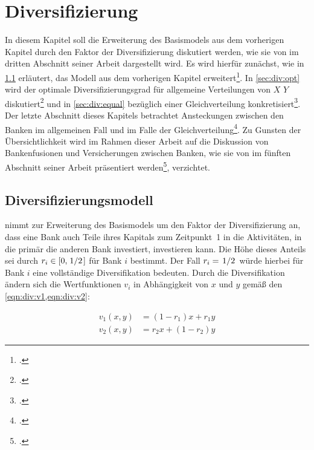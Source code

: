 
\chapter{Diversifizierung}%
\label{chap:div}

In diesem Kapitel soll die Erweiterung des Basismodels aus dem vorherigen Kapitel durch den Faktor der Diversifizierung diskutiert werden, wie sie von \citeauthor{Wagner-2010} im dritten Abschnitt seiner Arbeit dargestellt wird. Es wird hierfür zunächst, wie in \cref{sec:div:model} erläutert, das Modell aus dem vorherigen Kapitel erweitert\footcite[\pno~377\psq(5\psq)]{Wagner-2010}. In \cref{sec:div:opt} wird der optimale Diversifizierungsgrad für allgemeine Verteilungen von $X$ \bzw{} $Y$ diskutiert\footcite[\pno~378\psq(6\psq)]{Wagner-2010} und in \cref{sec:div:equal} bezüglich einer Gleichverteilung konkretisiert\footcite[\pno~379\psq(7\psq)]{Wagner-2010}. Der letzte Abschnitt dieses Kapitels betrachtet Ansteckungen zwischen den Banken im allgemeinen Fall und im Falle der Gleichverteilung\footcite[\ppno~382--385(10--13)]{Wagner-2010}. Zu Gunsten der Übersichtlichkeit wird im Rahmen dieser Arbeit auf die Diskussion von Bankenfusionen und Versicherungen zwischen Banken, wie sie von \citeauthor{Wagner-2010} im fünften Abschnitt seiner Arbeit präsentiert werden\footcite[\ppno~381\psq(9\psq)]{Wagner-2010}, verzichtet.

\section{Diversifizierungsmodell}%
\label{sec:div:model}

 nimmt zur Erweiterung des Basismodels um den Faktor der Diversifizierung an, dass eine Bank auch Teile ihres Kapitals zum Zeitpunkt~1 in die Aktivitäten, in die primär die anderen Bank investiert, investieren kann. Die Höhe dieses Anteils sei durch $r_i \in \left[0,\flatfrac{1}{2} \right]$ für Bank $i$ bestimmt. Der Fall $r_i = \flatfrac{1}{2}$ würde hierbei für Bank $i$ eine vollständige Diversifikation bedeuten. Durch die Diversifikation ändern sich die Wertfunktionen $v_i$ in Abhängigkeit von $x$ und $y$ gemäß den \cref{eqn:div:v1,eqn:div:v2}:

\begin{align}
	v_1(x,y) & = (1-r_1)x + r_1y \label{eqn:div:v1} \\
	v_2(x,y) & = r_2x + (1-r_2)y \label{eqn:div:v2}
\end{align}

